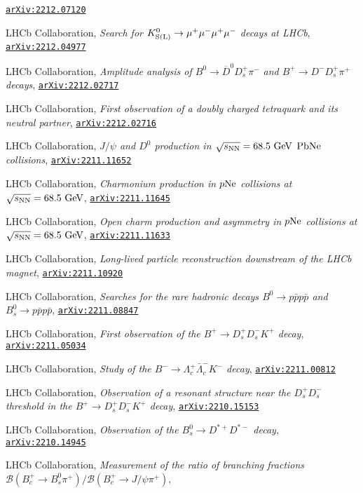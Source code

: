 \documentclass[a4paper, 11pt]{article}
\newenvironment{cvcontent}{
  \leftskip=0.5cm\rightskip=0cm
  \noindent\ignorespaces}{\par}
\newcommand{\arxiv}[1]{\href{https://arxiv.org/abs/#1}{\texttt{arXiv:#1}}}
\begin{document}
\begin{cvcontent}
\begin{enumerate}[label={[\arabic*]}, leftmargin=1.5cm]
    \arxiv{2212.07120}
    \sloppy
    \item LHCb Collaboration,
    \emph{Search for $K^0_{\rm{S(L)}} \to \mu^+ \mu^- \mu^+ \mu^-$ decays at LHCb},
    \arxiv{2212.04977}
    \item LHCb Collaboration,
    \emph{Amplitude analysis of $B^0 \to \overline{D}^0 D_s^+ \pi^-$ and $B^+ \to D^- D_s^+ \pi^+$ decays},
    \arxiv{2212.02717}
    \item LHCb Collaboration,
    \emph{First observation of a doubly charged tetraquark and its neutral partner},
    \arxiv{2212.02716}
    \sloppy
    \item LHCb Collaboration,
    \emph{$J/\psi$ and $D^0$ production in $\sqrt{s_{\rm{NN}}} = 68.5~\rm{GeV}$ $\rm{PbNe}$ collisions},
    \arxiv{2211.11652}
    \sloppy
    \item LHCb Collaboration,
    \emph{Charmonium production in \(p\rm{Ne}\) collisions at $\sqrt{s_{\rm{NN}}} = 68.5~\rm{GeV}$},
    \arxiv{2211.11645}
    \item LHCb Collaboration,
    \emph{Open charm production and asymmetry in $p\rm{Ne}$ collisions at $\sqrt{s_{\rm{NN}}} = 68.5~\rm{GeV}$},
    \arxiv{2211.11633}
    \sloppy
    \item LHCb Collaboration,
    \emph{Long-lived particle reconstruction downstream of the LHCb magnet},
    \arxiv{2211.10920}
    \sloppy
    \item LHCb Collaboration,
    \emph{Searches for the rare hadronic decays $B^0 \rightarrow p\bar{p}p\bar{p}$ and $B^0_{s} \rightarrow p\bar{p}p\bar{p}$},
    \arxiv{2211.08847}
    \item LHCb Collaboration,
    \emph{First observation of the $B^+ \rightarrow D_s^+ D_s^- K^+$ decay},
    \arxiv{2211.05034}
    \item LHCb Collaboration,
    \emph{Study of the $B^{-} \to \Lambda_{c}^{+} \bar{\Lambda}_{c}^{-} K^{-}$ decay},
    \arxiv{2211.00812}
    \item LHCb Collaboration,
    \emph{Observation of a resonant structure near the $D_s^+ D_s^-$ threshold in the $B^+\to D_s^+ D_s^- K^+$ decay},
    \arxiv{2210.15153}
    \item LHCb Collaboration,
    \emph{Observation of the $B^0_s \to D^{*+}D^{*-}$ decay},
    \arxiv{2210.14945}
    \item LHCb Collaboration,
    \emph{Measurement of the ratio of branching fractions $\mathcal{B}(B_c^+ \to B_s^0 \pi^+)/\mathcal{B}(B_c^+ \to J/\psi \pi^+)$},

\end{enumerate}
\end{cvcontent}
\end{document}
